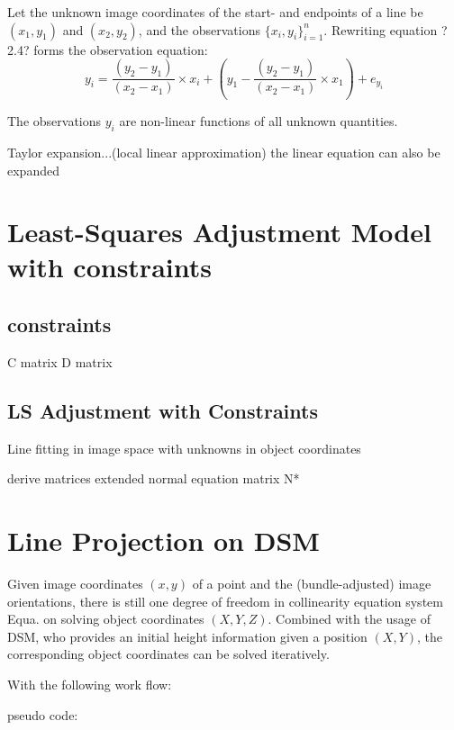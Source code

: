 Let the unknown image coordinates of the start- and endpoints of a line be $(x_1,y_1)$ and $(x_2,y_2)$, and the observations $\{x_i,y_i\}^n_{i=1}$. Rewriting equation ?2.4? forms the observation equation:
\begin{equation} %
y_i = \dfrac{(y_2-y_1)}{(x_2-x_1)}\times x_i+(y_1-\dfrac{(y_2-y_1)}{(x_2-x_1)}\times x_1) + e_{y_i}
\end{equation}

The observations $y_i$ are non-linear functions of all unknown quantities.

Taylor expansion...(local linear approximation)
the linear equation can also be expanded


\section{Least-Squares Adjustment Model with constraints}
\label{sec:}


\subsection{constraints}
\label{subsec:}

C matrix
D matrix

\subsection{LS Adjustment with Constraints}
\label{sec:}
Line fitting in image space with unknowns in object coordinates


derive matrices
extended normal equation matrix N*


\section{Line Projection on DSM}
\label{sec:}

Given image coordinates $(x,y)$ of a point and the (bundle-adjusted) image orientations, there is still one degree of freedom in collinearity equation system Equa. on solving object coordinates $(X,Y,Z)$. Combined with the usage of DSM, who provides an initial height information given a position $(X,Y)$, the corresponding object coordinates can be solved iteratively.

With the following work flow:

pseudo code:

